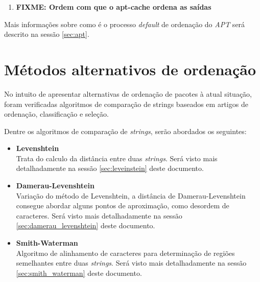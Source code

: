 \begin{enumerate}
	\item  \textbf{FIXME: Ordem com que o apt-cache ordena as saídas}
\end{enumerate}

Mais informações sobre como é o processo \textit{default} de ordenação do \textit{APT} será descrito na sessão \ref{sec:apt}.


\section{Métodos alternativos de ordenação} %
\label{sec:m_todos_alternativos_de_ordena_o}

No intuito de apresentar alternativas de ordenação de pacotes à atual situação, foram verificadas algoritmos de comparação de strings baseados em artigos de ordenação, classificação e seleção.

Dentre os algoritmos de comparação de \textit{strings}, serão abordados os seguintes:

\begin{itemize}
	\item \textbf{Levenshtein}\\
	Trata do calculo da distância entre duas \textit{strings}. Será visto mais detalhadamente na sessão \ref{sec:leveinstein} deste documento.
%
	\item \textbf{Damerau-Levenshtein}\\
	Variação do método de Levenshtein, a distância de Damerau-Levenshtein consegue abordar alguns pontos de aproximação, como desordem de caracteres. Será visto mais detalhadamente na sessão \ref{sec:damerau_levenshtein} deste documento.
%
	\item \textbf{Smith-Waterman}\\
	Algoritmo de alinhamento de caracteres para determinação de regiões semelhantes entre duas \textit{strings}. Será visto mais detalhadamente na sessão \ref{sec:smith_waterman} deste documento.

\end{itemize}
